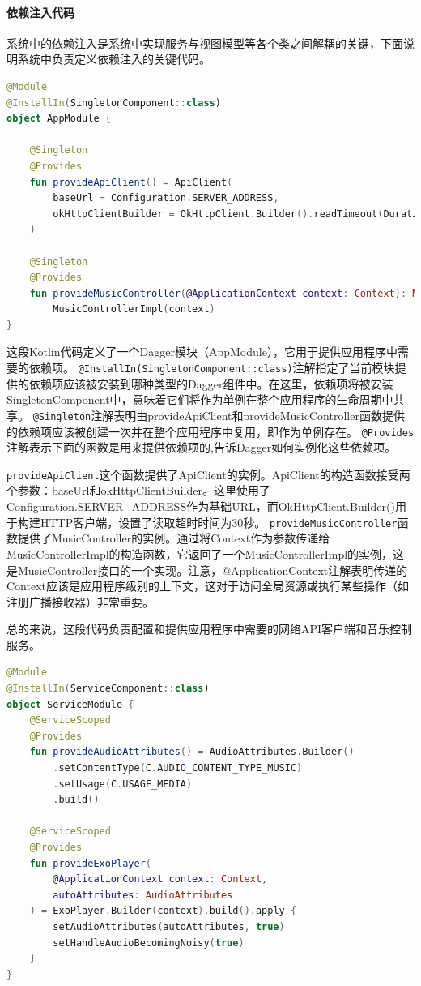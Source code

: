 \documentclass[main.tex]{subfiles}
\begin{document}
\paragraph{依赖注入代码}

系统中的依赖注入是系统中实现服务与视图模型等各个类之间解耦的关键，下面说明系统中负责定义依赖注入的关键代码。

\begin{lstlisting}[language=Kotlin]
@Module
@InstallIn(SingletonComponent::class)
object AppModule {

    @Singleton
    @Provides
    fun provideApiClient() = ApiClient(
        baseUrl = Configuration.SERVER_ADDRESS,
        okHttpClientBuilder = OkHttpClient.Builder().readTimeout(Duration.ofSeconds(30))
    )

    @Singleton
    @Provides
    fun provideMusicController(@ApplicationContext context: Context): MusicController =
        MusicControllerImpl(context)
}
\end{lstlisting}

这段Kotlin代码定义了一个Dagger模块（AppModule），它用于提供应用程序中需要的依赖项。
\texttt{@InstallIn(SingletonComponent::class)}注解指定了当前模块提供的依赖项应该被安装到哪种类型的Dagger组件中。在这里，依赖项将被安装SingletonComponent中，意味着它们将作为单例在整个应用程序的生命周期中共享。
\texttt{@Singleton}注解表明由provideApiClient和provideMusicController函数提供的依赖项应该被创建一次并在整个应用程序中复用，即作为单例存在。
\texttt{@Provides}注解表示下面的函数是用来提供依赖项的,告诉Dagger如何实例化这些依赖项。

\texttt{provideApiClient}这个函数提供了ApiClient的实例。ApiClient的构造函数接受两个参数：baseUrl和okHttpClientBuilder。这里使用了Configuration.SERVER\_ADDRESS作为基础URL，而OkHttpClient.Builder()用于构建HTTP客户端，设置了读取超时时间为30秒。
\texttt{provideMusicController}函数提供了MusicController的实例。通过将Context作为参数传递给MusicControllerImpl的构造函数，它返回了一个MusicControllerImpl的实例，这是MusicController接口的一个实现。注意，@ApplicationContext注解表明传递的Context应该是应用程序级别的上下文，这对于访问全局资源或执行某些操作（如注册广播接收器）非常重要。

总的来说，这段代码负责配置和提供应用程序中需要的网络API客户端和音乐控制服务。

\begin{lstlisting}[language=Kotlin]
@Module
@InstallIn(ServiceComponent::class)
object ServiceModule {
    @ServiceScoped
    @Provides
    fun provideAudioAttributes() = AudioAttributes.Builder()
        .setContentType(C.AUDIO_CONTENT_TYPE_MUSIC)
        .setUsage(C.USAGE_MEDIA)
        .build()

    @ServiceScoped
    @Provides
    fun provideExoPlayer(
        @ApplicationContext context: Context,
        autoAttributes: AudioAttributes
    ) = ExoPlayer.Builder(context).build().apply {
        setAudioAttributes(autoAttributes, true)
        setHandleAudioBecomingNoisy(true)
    }
}
\end{lstlisting}
\end{document}
